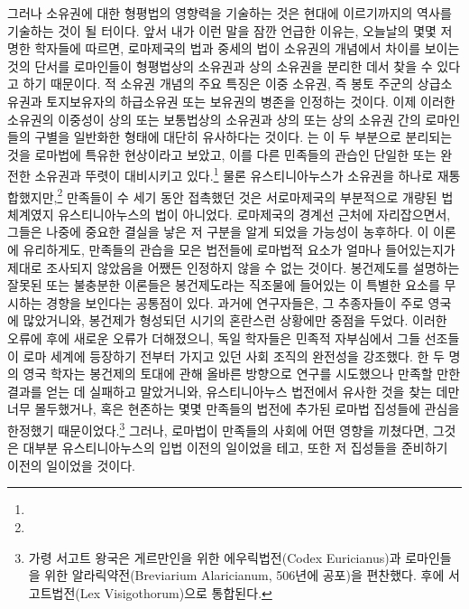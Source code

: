 그러나 소유권에 대한 형평법의 영향력을 기술하는 것은
현대에 이르기까지의 역사를 기술하는 것이 될 터이다.
앞서 내가 이런 말을 잠깐 언급한 이유는,
오늘날의 몇몇 저명한 학자들에 따르면,
로마제국의 법과 중세의 법이 소유권의 개념에서 차이를 보이는 것의 단서를
로마인들이 형평법상의 소유권과 상의 소유권을 분리한 데서
찾을 수 있다고 하기 때문이다.
적 소유권 개념의 주요 특징은
이중 소유권,
즉 봉토 주군의 상급소유권과
토지보유자의 하급소유권 또는 보유권의
병존을 인정하는 것이다.
이제 이러한 소유권의 이중성이
상의 또는 보통법상의 소유권과
상의 또는 상의 소유권 간의
로마인들의
구별을
일반화한 형태에 대단히 유사하다는 것이다.
는
이 두 부분으로 분리되는 것을
로마법에 특유한 현상이라고 보았고,
이를 다른 민족들의 관습인
단일한 또는 완전한 소유권과 뚜렷이
대비시키고 있다.\footnote{%
   }
물론
유스티니아누스가 소유권을
하나로 재통합했지만,\footnote{%
  }
만족들이 수 세기 동안 접촉했던 것은
서로마제국의 부분적으로 개량된 법체계였지
유스티니아누스의 법이 아니었다.
로마제국의 경계선 근처에 자리잡으면서,
그들은
나중에 중요한 결실을 낳은
저 구분을 알게 되었을 가능성이 농후하다.
이 이론에 유리하게도,
만족들의 관습을 모은 법전들에
로마법적 요소가 얼마나 들어있는지가
제대로 조사되지 않았음을
어쨌든 인정하지 않을 수 없는 것이다.
봉건제도를 설명하는 잘못된 또는 불충분한 이론들은
봉건제도라는 직조물에 들어있는
이 특별한 요소를 무시하는 경향을 보인다는 공통점이 있다.
과거에 연구자들은,
그 추종자들이 주로 영국에 많았거니와,
봉건제가 형성되던 시기의 혼란스런 상황에만 중점을 두었다.
이러한 오류에 후에 새로운 오류가 더해졌으니,
독일 학자들은
민족적 자부심에서
그들 선조들이 로마 세계에 등장하기 전부터
가지고 있던 사회 조직의 완전성을 강조했다.
한 두 명의 영국 학자는
봉건제의 토대에 관해
올바른 방향으로 연구를
시도했으나
만족할 만한 결과를 얻는 데 실패하고 말았거니와,
유스티니아누스 법전에서 유사한 것을 찾는 데만 너무 몰두했거나,
혹은 현존하는 몇몇 만족들의 법전에 추가된
로마법 집성들에 관심을 한정했기 때문이었다.\footnote{%
  가령 서고트 왕국은 게르만인을 위한 에우릭법전(Codex Euricianus)과
  로마인들을 위한 알라릭약전(Breviarium Alaricianum, 506년에 공포)을 편찬했다.
  후에 서고트법전(Lex Visigothorum)으로 통합된다. }
그러나,
로마법이 만족들의 사회에 어떤 영향을 끼쳤다면,
그것은
대부분
유스티니아누스의 입법 이전의 일이었을 테고,
또한 저 집성들을 준비하기 이전의 일이었을 것이다.
